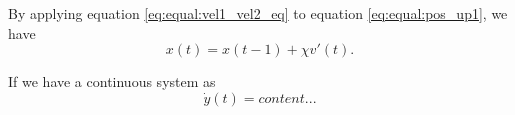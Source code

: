 \documentclass[12pt]{article}
\begin{document}
By applying equation \eqref{eq:equal:vel1_vel2_eq} to equation \eqref{eq:equal:pos_up1}, we have
\begin{equation}
x(t) = x(t-1) + \chi v'(t).
\end{equation}

If we have a continuous system as
\begin{subequations}
\begin{equation}
\dot{y}(t) = 
\end{equation}
\begin{equation}
content...
\end{equation}
\end{subequations}
\end{document}
